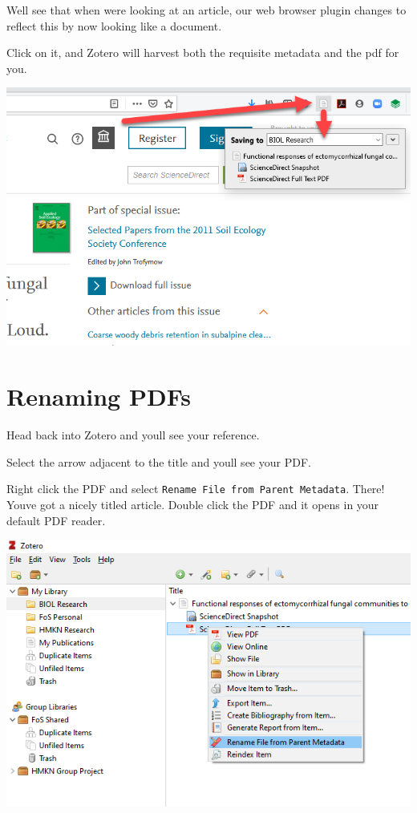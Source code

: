 \documentclass[
]{book}
\begin{document}
We\textquotesingle ll see that when we\textquotesingle re looking at an article, our web browser plugin changes to reflect this by now looking like a document.

Click on it, and Zotero will harvest both the requisite metadata and the pdf for you.

\includegraphics{images/Z_FirstImport.png}

\hypertarget{renaming-pdfs}{%
\section{Renaming PDFs}\label{renaming-pdfs}}

Head back into Zotero and you\textquotesingle ll see your reference.

Select the arrow adjacent to the title and you\textquotesingle ll see your PDF.

Right click the PDF and select \texttt{Rename\ File\ from\ Parent\ Metadata}. There! You\textquotesingle ve got a nicely titled article. Double click the PDF and it opens in your default PDF reader.

\includegraphics{images/Z_PDFRename.png}
\end{document}
